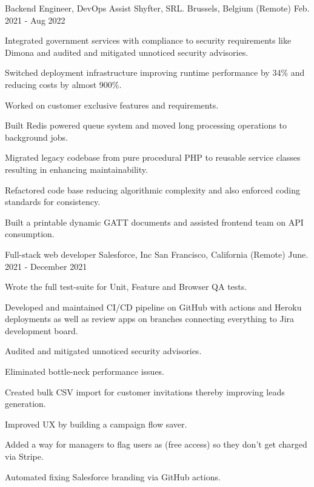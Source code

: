 \begin{cventries}
  \cventry
    {Backend Engineer, DevOps Assist} %
    {Shyfter, SRL.} %
    {Brussels, Belgium (Remote)} %
    {Feb. 2021 - Aug 2022} %
    {
      \begin{cvitems} %
        \item {Integrated government services with compliance to security requirements like Dimona and audited and mitigated unnoticed security advisories.}
        \item {Switched deployment infrastructure improving runtime performance by 34\% and reducing costs by almost 900\%.}
        \item {Worked on customer exclusive features and requirements.}
        \item {Built Redis powered queue system and moved long processing operations to background jobs.}
        \item {Migrated legacy codebase from pure procedural PHP to reusable service classes resulting in enhancing maintainability.}
        \item {Refactored code base reducing algorithmic complexity and also enforced coding standards for consistency.}
        \item {Built a printable dynamic GATT documents and assisted frontend team on API consumption.}
      \end{cvitems}
    }

  \cventry
    {Full-stack web developer} %
    {Salesforce, Inc} %
    {San Francisco, California (Remote)} %
    {June. 2021 - December 2021} %
    {
      \begin{cvitems} %
        \item {Wrote the full test-suite for Unit, Feature and Browser QA tests.}
        \item {Developed and maintained CI/CD pipeline on GitHub with actions and Heroku deployments as well as review apps on branches connecting everything to Jira development board.}
        \item {Audited and mitigated unnoticed security advisories.}
        \item {Eliminated bottle-neck performance issues.}
        \item {Created bulk CSV import for customer invitations thereby improving leads generation.}
        \item {Improved UX by building a campaign flow saver.}
        \item {Added a way for managers to flag users as (free access) so they don't get charged via Stripe.}
        \item {Automated fixing Salesforce branding via GitHub actions.}
      \end{cvitems}
     }


\end{cventries}
